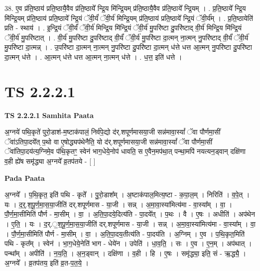 \documentclass[17pt]{extarticle}
\begin{document}
38. ए॒व प्र॑ति॒ष्ठाय॑ प्रति॒ष्ठायै॒वैव प्र॑ति॒ष्ठाये᳚ न्द्रि॒य मि॑न्द्रि॒यम् प्र॑ति॒ष्ठायै॒वैव प्र॑ति॒ष्ठाये᳚ न्द्रि॒यम् । . प्र॒ति॒ष्ठाये᳚ न्द्रि॒य मि॑न्द्रि॒यम् प्र॑ति॒ष्ठाय॑ प्रति॒ष्ठाये᳚ न्द्रि॒यं ॅवी॒र्यं॑ ॅवी॒र्य॑ मिन्द्रि॒यम् प्र॑ति॒ष्ठाय॑ प्रति॒ष्ठाये᳚ न्द्रि॒यं ॅवी॒र्य᳚म् । . प्र॒ति॒ष्ठायेति॑ प्रति - स्थाय॑ । . इ॒न्द्रि॒यं ॅवी॒र्यं॑ ॅवी॒र्य॑ मिन्द्रि॒य मि॑न्द्रि॒यं ॅवी॒र्य॑ मु॒परि॑ष्टा दु॒परि॑ष्टाद् वी॒र्य॑ मिन्द्रि॒य मि॑न्द्रि॒यं ॅवी॒र्य॑ मु॒परि॑ष्टात् । . वी॒र्य॑ मु॒परि॑ष्टा दु॒परि॑ष्टाद् वी॒र्यं॑ ॅवी॒र्य॑ मु॒परि॑ष्टा दा॒त्मन् ना॒त्मन् नु॒परि॑ष्टाद् वी॒र्यं॑ ॅवी॒र्य॑ मु॒परि॑ष्टा दा॒त्मन्न् । . उ॒परि॑ष्टा दा॒त्मन् ना॒त्मन् नु॒परि॑ष्टा दु॒परि॑ष्टा दा॒त्मन् ध॑त्ते धत्त आ॒त्मन् नु॒परि॑ष्टा दु॒परि॑ष्टा दा॒त्मन् ध॑त्ते । . आ॒त्मन् ध॑त्ते धत्त आ॒त्मन् ना॒त्मन् ध॑त्ते । . ध॒त्त॒ इति॑ धत्ते । \newline
\pagebreak
{}
\section*{ TS 2.2.2.1 }

\textbf{TS 2.2.2.1 } \newline
\textbf{Samhita Paata} \newline

अ॒ग्नये॑ पथि॒कृते॑ पुरो॒डाश॑-म॒ष्टाक॑पालं॒ निर्व॑पे॒द्यो द॑र्.शपूर्णमासया॒जी सन्न॑मावा॒स्यां᳚ ॅवा पौर्णमा॒सीं ॅवा॑ऽतिपा॒दये᳚त् प॒थो वा ए॒षोद्ध्यप॑थेनैति॒ यो द॑र्.शपूर्णमासया॒जी सन्न॑मावा॒स्यां᳚ ॅवा पौर्णमा॒सीं ॅवा॑तिपा॒दय॑त्य॒ग्निमे॒व प॑थि॒कृतꣳ॒॒ स्वेन॑ भाग॒धेये॒नोप॑ धावति॒ स ए॒वैन॒मप॑था॒त् पन्था॒मपि॑ नयत्यन॒ड्वान् दक्षि॑णा व॒ही ह्ये॑ष समृ॑द्ध्या अ॒ग्नये᳚ व्र॒तप॑तये - [  ] \newline

\textbf{Pada Paata} \newline

अ॒ग्नये᳚ । प॒थि॒कृत॒ इति॑ पथि - कृते᳚ । पु॒रो॒डाश᳚म् । अ॒ष्टाक॑पाल॒मित्य॒ष्टा - क॒पा॒ल॒म् । निरिति॑ । व॒पे॒त् । यः । द॒र्॒.श॒पू॒र्ण॒मा॒स॒या॒जीति॑ दर्.शपूर्णमास - या॒जी । सन्न् । अ॒मा॒वा॒स्या॑मित्य॑मा - वा॒स्या᳚म् । वा॒ । पौ॒र्ण॒मा॒सीमिति॑ पौर्ण - मा॒सीम् । वा॒ । अ॒ति॒पा॒दये॒दित्य॑ति - पा॒दये᳚त् । प॒थः । वै । ए॒षः । अधीति॑ । अप॑थेन । ए॒ति॒ । यः । द॒र्.॒श॒पू॒र्ण॒मा॒स॒या॒जीति॑ दर्.शपूर्णमास - या॒जी । सन्न् । अ॒मा॒वा॒स्या॑मित्य॑मा - वा॒स्या᳚म् । वा॒ । पौ॒र्ण॒मा॒सीमिति॑ पौर्ण - मा॒सीम् । वा॒ । अ॒ति॒पा॒दय॒तीत्य॑ति - पा॒दय॑ति । अ॒ग्निम् । ए॒व । प॒थि॒कृत॒मिति॑ पथि - कृत᳚म् । स्वेन॑ । भा॒ग॒धेये॒नेति॑ भाग - धेये॑न । उपेति॑ । धा॒व॒ति॒ । सः । ए॒व । ए॒न॒म् । अप॑थात् । पन्था᳚म् । अपीति॑ । न॒य॒ति॒ । अ॒न॒ड्वान् । दक्षि॑णा । व॒ही । हि । ए॒षः । समृ॑द्ध्या॒ इति॒ सं - ऋ॒द्ध्यै॒ । अ॒ग्नये᳚ । व्र॒तप॑तय॒ इति॑ व्र॒त-प॒त॒ये॒ ।  \newline
\end{document}
